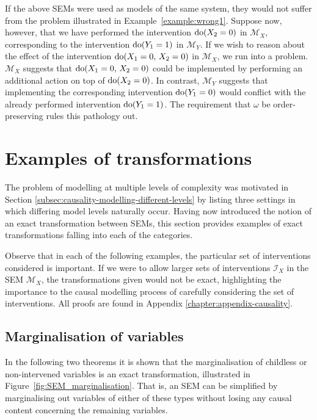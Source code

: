 If the above SEMs were used as models of the same system, they would not suffer from the problem illustrated in Example~\ref{example:wrong1}.
Suppose now, however, that we have performed the intervention $\operatorname{do}(X_2=0)$ in $\mathcal{M}_X$, corresponding to the intervention $\operatorname{do}(Y_1=1)$ in $\mathcal{M}_Y$.
If we wish to reason about the effect of the intervention $\operatorname{do}(X_1=0,\, X_2=0)$ in $\mathcal{M}_X$, we run into a problem.
$\mathcal{M}_X$ suggests that $\operatorname{do}(X_1=0,\, X_2=0)$ could be implemented by performing an additional action on top of $\operatorname{do}(X_2=0)$.
In contrast, $\mathcal{M}_Y$ suggests that implementing the corresponding intervention $\operatorname{do}(Y_1=0)$ would conflict with the already performed intervention $\operatorname{do}(Y_1=1)$.
The requirement that $\omega$ be order-preserving rules this pathology out. 

\section{Examples of transformations}\label{sec:causality-causal-examples-of-transformations}

The problem of modelling at multiple levels of complexity was motivated in Section \ref{subsec:causality-modelling-different-levels} by listing three settings in which differing model levels naturally occur.
Having now introduced the notion of an exact transformation between SEMs, this section provides examples of exact transformations falling into each of the categories.

Observe that in each of the following examples, the particular set of interventions considered is important. If we were to allow larger sets of interventions $\mathcal{I}_X$ in the SEM $\mathcal{M}_X$, the transformations given would not be exact, highlighting the importance to the causal modelling process of carefully considering the set of interventions. All proofs are found in Appendix \ref{chapter:appendix-causality}.






\subsection{Marginalisation of variables}\label{sec:basic_trafos}

In the following two theorems it is shown that the marginalisation of childless or non-intervened variables is an exact transformation, illustrated in Figure~\ref{fig:SEM_marginalisation}.
That is, an SEM can be simplified by marginalising out variables of either of these types without losing any causal content concerning the remaining variables.

